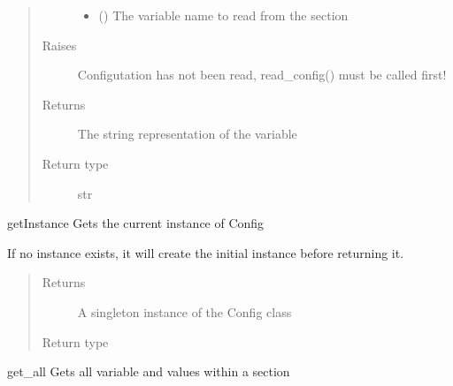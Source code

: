 \documentclass[letterpaper,10pt,english]{sphinxmanual}
\begin{document}
\begin{fulllineitems}
\begin{fulllineitems}
\begin{quote}
\begin{description}
\begin{itemize}
\item {} 
 () \textendash{} The variable name to read from the section

\end{itemize}

\item[{Raises}] \leavevmode
{} \textendash{} Configutation has not been read, read\_config() must be called first!

\item[{Returns}] \leavevmode
The string representation of the variable

\item[{Return type}] \leavevmode
str

\end{description}\end{quote}

\end{fulllineitems}


\begin{fulllineitems}
\label{\detokenize{index:config.config_manager.Config.getInstance}}
getInstance Gets the current instance of Config

If no instance exists, it will create the initial instance
before returning it.
\begin{quote}\begin{description}
\item[{Returns}] \leavevmode
A singleton instance of the Config class

\item[{Return type}] \leavevmode
{}

\end{description}\end{quote}

\end{fulllineitems}


\begin{fulllineitems}
\label{\detokenize{index:config.config_manager.Config.get_all}}
get\_all Gets all variable and values within a section


\end{fulllineitems}
\end{fulllineitems}
\end{document}

